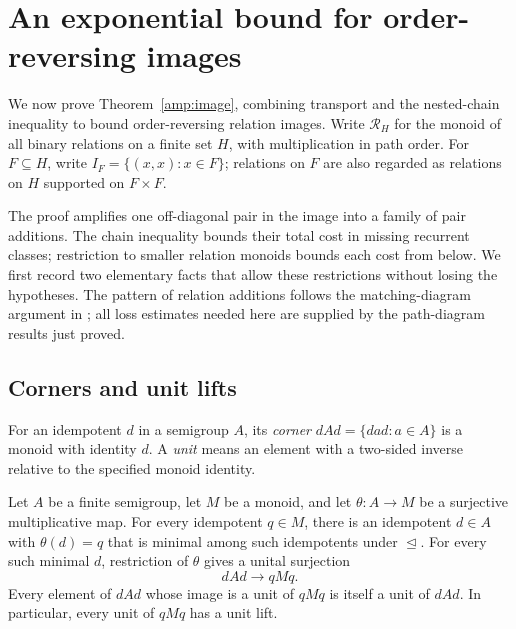 \section{An exponential bound for order-reversing images}
\label{amp:section}

We now prove Theorem~\ref{amp:image}, combining transport and the
nested-chain inequality to bound order-reversing relation images.
Write $\mathcal R_H$ for the monoid of all binary relations
on a finite set $H$, with multiplication in path order.  For
$F\subseteq H$, write $I_F=\{(x,x):x\in F\}$; relations on $F$ are
also regarded as relations on $H$ supported on $F\times F$.

The proof amplifies one off-diagonal pair in the image into a family
of pair additions.  The chain inequality bounds their total cost in
missing recurrent classes; restriction to smaller relation monoids
bounds each cost from below.  We first record two elementary facts
that allow these restrictions without losing the hypotheses.
The pattern of relation additions follows the matching-diagram
argument in \cite[Section~3]{CompanionDeterminization2026}; all loss estimates
needed here are supplied by the path-diagram results just proved.

\subsection{Corners and unit lifts}

For an idempotent $d$ in a semigroup $A$, its \emph{corner}
$dAd=\{dad:a\in A\}$ is a monoid with identity $d$.
A \emph{unit} means an element with a two-sided inverse relative to
the specified monoid identity.

\begin{lemma}
\label{amp:minimal-corner}
Let $A$ be a finite semigroup, let $M$ be a monoid, and let
$\theta:A\to M$ be a surjective multiplicative map.  For every
idempotent $q\in M$, there is an idempotent $d\in A$ with
$\theta(d)=q$ that is minimal among such idempotents under
$\trianglelefteq$.  For every such minimal $d$, restriction of
$\theta$ gives a unital surjection
\[
 dAd\longrightarrow qMq.
\]
Every element of $dAd$ whose image is a unit of $qMq$ is itself a
unit of $dAd$.  In particular, every unit of $qMq$ has a unit lift.
\end{lemma}

